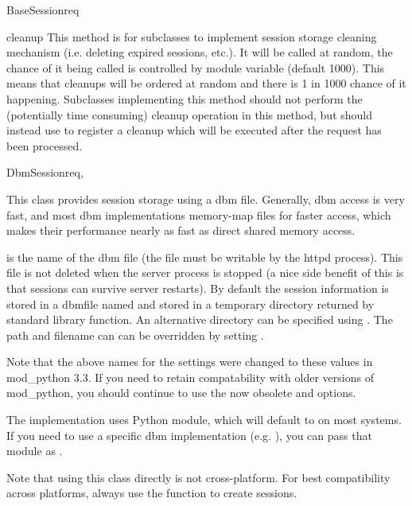 \begin{classdesc}{BaseSession}{req}
  \begin{methoddesc}[BaseSession]{cleanup}{}
    This method is for subclasses to implement session storage
    cleaning mechanism (i.e. deleting expired sessions, etc.). It will
    be called at random, the chance of it being called is controlled
    by   module variable
    (default 1000). This means that cleanups will be ordered at random
    and there is 1 in 1000 chance of it happening. Subclasses
    implementing this method should not perform the (potentially time
    consuming) cleanup operation in this method, but should instead
    use  to register a cleanup which will
    be executed after the request has been processed.
  \end{methoddesc}

\end{classdesc}

\begin{classdesc}{DbmSession}{req, }

  This class provides session storage using a dbm file. Generally, dbm
  access is very fast, and most dbm implementations memory-map files
  for faster access, which makes their performance nearly as fast as
  direct shared memory access.

   is the name of the dbm file (the file must be writable by
  the httpd process). This file is not deleted when the server process
  is stopped (a nice side benefit of this is that sessions can survive
  server restarts). By default the session information is stored in a
  dbmfile named  and stored in a temporary directory
  returned by  standard library
  function. An alternative directory can be specified using
  . The path and filename can can be overridden by
  setting .

  Note that the above names for the  settings were
  changed to these values in mod_python 3.3. If you need to retain
  compatability with older versions of mod_python, you should continue
  to use the now obsolete  and 
  options.

  The implementation uses Python  module, which will
  default to  on most systems. If you need to use a
  specific dbm implementation (e.g. ), you can pass that
  module as .

  Note that using this class directly is not cross-platform. For best
  compatibility across platforms, always use the 
  function to create sessions.

\end{classdesc}

